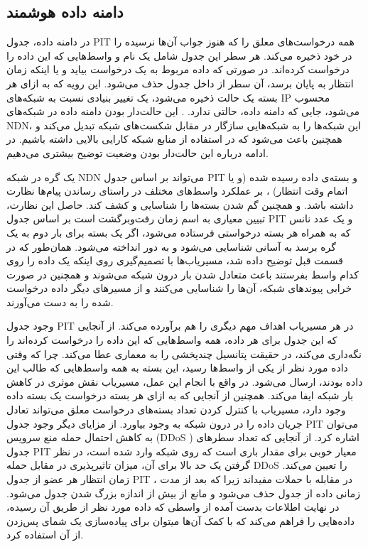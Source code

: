  
\subsection{دامنه داده هوشمند}
در دامنه داده، جدول PIT همه درخواست‌های معلق را که هنوز جواب آن‌ها نرسیده را در خود ذخیره می‌کند. هر سطر این جدول شامل یک نام و واسط‌هایی که این داده را درخواست کرده‌اند. در صورتی که داده مربوط به یک درخواست بیاید و یا اینکه زمان انتظار به پایان برسد، آن سطر از داخل جدول حذف می‌شود. این رویه که به ازای هر بسته یک حالت ذخیره می‌شود، یک تغییر بنیادی نسبت به شبکه‌های IP محسوب می‌شود، جایی که دامنه داده، حالتی ندارد.    . این حالت‌دار بودن دامنه داده در شبکه‌های NDN، این شبکه‌ها را به شبکه‌هایی سازگار در مقابل شکست‌های شبکه تبدیل می‌کند و همچنین باعث می‌شود که در استفاده از منابع شبکه کارایی بالایی داشته باشیم. در ادامه درباره این حالت‌دار بودن وضعیت توضیح بیشتری می‌دهیم. 

 یک گره در شبکه NDN  می‌تواند بر اساس جدول PIT و بسته‌ی داده رسیده شده (‌و یا اتمام وقت انتظار) ،  بر عملکرد واسط‌های مختلف در راستای رساندن پیام‌ها نظارت داشته باشد. و همچنین گم شدن بسته‌ها را شناسایی و کشف کند. حاصل این نظارت، تبیین معیاری به اسم زمان رفت‌وبرگشت است  بر اساس جدول PIT  و یک عدد نانس که به همراه هر بسته درخواستی فرستاده می‌شود، اگر یک بسته برای بار دوم به یک گره برسد به آسانی شناسایی می‌شود و به دور انداخته می‌شود. همان‌طور که در قسمت قبل توضیح داده‌ شد، مسیریاب‌ها با تصمیم‌گیری روی اینکه یک داده را روی کدام واسط بفرستند باعث متعادل شدن بار درون شبکه می‌شوند و همچنین در صورت خرابی پیوندهای شبکه، آن‌ها را شناسایی می‌کنند و از مسیرهای دیگر داده درخواست شده را به دست می‌آورند. 
 
وجود جدول PIT  در هر مسیریاب اهداف مهم دیگری را هم برآورده می‌کند. از آنجایی که این جدول برای هر داده، همه واسط‌هایی که این داده را درخواست کرده‌اند را نگه‌داری می‌کند، در حقیقت پتانسیل چندپخشی را به معماری عطا می‌کند. چرا که وقتی داده مورد نظر از یکی از واسط‌ها رسید، این بسته به همه واسط‌هایی که طالب این داده بودند، ارسال می‌شود. در واقع با انجام این عمل، مسیریاب نقش موثری در کاهش بار شبکه ایفا می‌کند. همچنین از آنجایی که به ازای هر بسته درخواست یک بسته داده وجود دارد، مسیریاب با کنترل کردن تعداد بسته‌های درخواست معلق می‌تواند تعادل جریان داده را در درون شبکه به وجود بیاورد.  از مزایای دیگر وجود جدول PIT می‌توان به کاهش احتمال حمله منع سرویس 
(DDoS )
 اشاره کرد. از آنجایی که تعداد سطر‌های جدول PIT  معیار خوبی برای مقدار باری است که روی شبکه وارد شده است، در نظر گرفتن یک حد بالا برای آن، میزان تاثیرپذیری در مقابل حمله DDoS را تعیین می‌کند. زمان انتظار هر عضو از جدول PIT ، در مقابله با حملات مفید‌اند زیرا که بعد از مدت زمانی داده از جدول حذف می‌شود و مانع از بیش از اندازه بزرگ شدن جدول می‌شود.
\cite{lads}
در نهایت اطلاعات بدست آمده از واسطی که داده مورد نظر از طریق آن رسیده، داده‌هایی را فراهم می‌کند که با کمک آن‌‌ها میتوان برای  پیاده‌سازی یک شمای پس‌زدن
\cite{pushback}
 از آن استفاده کرد. 

